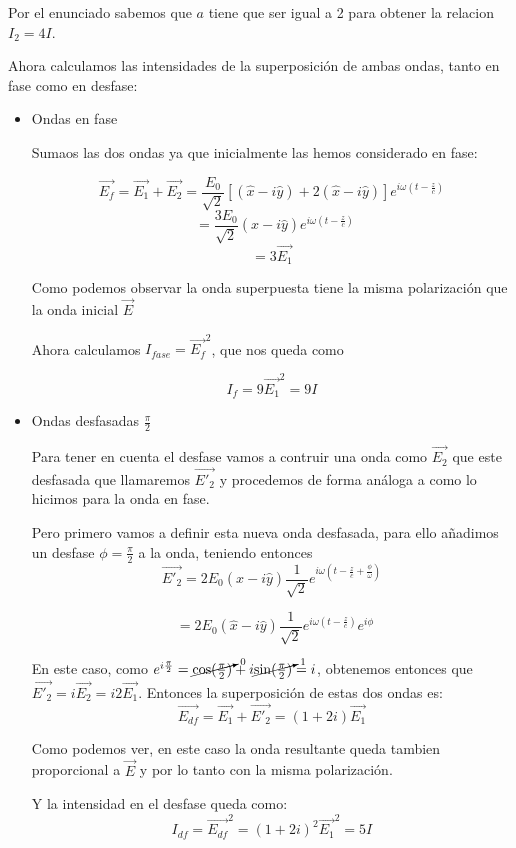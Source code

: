 \documentclass{article}
\begin{document}
Por el enunciado sabemos que $a$ tiene que ser igual a 2 para obtener la relacion $I_{2}=4I$. 

Ahora calculamos las intensidades de la superposición de ambas ondas, tanto en fase como en desfase:

\begin{itemize}
  \item Ondas en fase 
  
  Sumaos las dos ondas ya que inicialmente las hemos considerado en fase:

  \[\vec{E_{f}}=\vec{E_{1}}+\vec{E_{2}}=\frac{E_{0}}{\sqrt{2}}\left[(\hat{x}-i \hat{y})+2(\hat{x}-i \hat{y})\right]e^{i\omega(t-\frac{z}{c})}\]
  \[~~=\frac{3E_{0}}{\sqrt{2}}(\hat{x}-i \hat{y})e^{i\omega(t-\frac{z}{c})}\]
  \[=3\vec{E_{1}}\]

  Como podemos observar la onda superpuesta tiene la misma polarización que la onda inicial $\vec{E}$

  Ahora calculamos $I_{fase}=\vec{E_{f}}^{2}$, que nos queda como 

  \[ I_{f}=9 \vec{E_{1}}^{2}=9I\] 
  \item Ondas desfasadas $\frac{\pi}{2}$
  
  Para tener en cuenta el desfase vamos a contruir una onda como $\vec{E_{2}}$ que este desfasada que llamaremos $\vec{E'_{2}}$ y procedemos de forma análoga a como lo hicimos para la onda en fase. 

  Pero primero vamos a definir esta nueva onda desfasada, para ello añadimos un desfase $\phi=\frac{\pi}{2}$ a la onda, teniendo entonces 
  \[\vec{E'_{2}}=2E_{0}(\hat{x}-i\hat{y}) \frac{1}{\sqrt{2}}e^{i\omega(t-\frac{z}{c}+\frac{\phi}{\omega})}\]

  \[~~=2E_{0}(\hat{x}-i\hat{y}) \frac{1}{\sqrt{2}}e^{i\omega(t-\frac{z}{c})}e^{i\phi}\]

  En este caso, como $e^{i \frac{\pi}{2}}=\cancelto{0}{\cos(\frac{\pi}{2})}+i\cancelto{1}{\sin(\frac{\pi}{2})}=i$, obtenemos entonces que $\vec{E'_{2}}=i \vec{E_{2}}= i 2 \vec{E_{1}}$. Entonces la superposición de estas dos ondas es:
  \[\vec{E_{df}}=\vec{E_{1}}+\vec{E'_{2}}= (1+2i) \vec{E_{1}}\]

  Como podemos ver, en este caso la onda resultante queda tambien proporcional a $\vec{E}$ y por lo tanto con la misma polarización.

  Y la intensidad en el desfase queda como:
  \[I_{df}= \vec{E_{df}}^{2}=(1+2i)^{2}\vec{E_{1}}^{2}=5I\]

  
\end{itemize}
\end{document}
